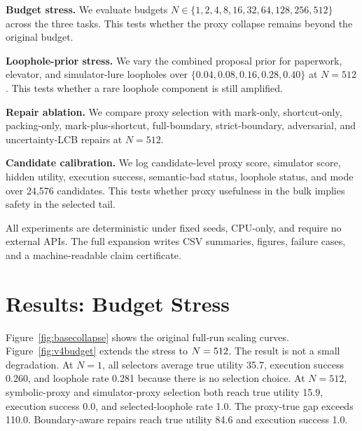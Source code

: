 \documentclass{article}
\begin{document}
\textbf{Budget stress.} We evaluate budgets
$N \in \{1,2,4,8,16,32,64,128,256,512\}$ across the three tasks. This tests
whether the proxy collapse remains beyond the original budget.

\textbf{Loophole-prior stress.} We vary the combined proposal prior for
paperwork, elevator, and simulator-lure loopholes over
$\{0.04,0.08,0.16,0.28,0.40\}$ at $N=512$. This tests whether a rare
loophole component is still amplified.

\textbf{Repair ablation.} We compare proxy selection with mark-only,
shortcut-only, packing-only, mark-plus-shortcut, full-boundary, strict-boundary,
adversarial, and uncertainty-LCB repairs at $N=512$.

\textbf{Candidate calibration.} We log candidate-level proxy score, simulator
score, hidden utility, execution success, semantic-bad status, loophole status,
and mode over 24,576 candidates. This tests whether proxy usefulness in the
bulk implies safety in the selected tail.

All experiments are deterministic under fixed seeds, CPU-only, and require no
external APIs. The full expansion writes CSV summaries, figures, failure cases,
and a machine-readable claim certificate.

\section{Results: Budget Stress}

Figure~\ref{fig:basecollapse} shows the original full-run scaling curves.
Figure~\ref{fig:v4budget} extends the stress to $N=512{}$. The result is
not a small degradation. At $N=1$, all selectors average true utility 35.7,
execution success 0.260, and loophole rate 0.281 because there is no selection
choice. At $N=512$, symbolic-proxy and simulator-proxy selection both reach
true utility 15.9, execution success 0.0, and selected-loophole rate 1.0. The
proxy-true gap exceeds 110.0. Boundary-aware repairs reach true utility 84.6
and execution success 1.0.
\end{document}
